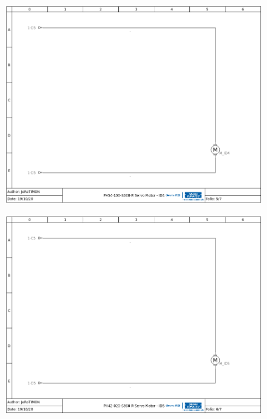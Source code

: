 \documentclass[
12pt,					%
openright,				%
twoside,				%
a4paper,				%
english,
brazil
]{ABNT/abntex2_report}
\begin{document}
	\begin{figure}[H]
		\centering
		\includegraphics[scale=0.72]{appendix/wiring_5.png}
		\label{fig:wiring5}
	\end{figure}

	\begin{figure}[H]
		\centering
		\includegraphics[scale=0.72]{appendix/wiring_6.png}
		\label{fig:wiring6}
	\end{figure}
\end{document}

